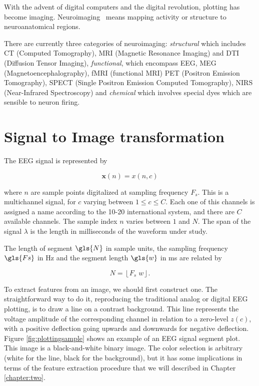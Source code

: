 
\begin{story}[Neuroimaging]
With the advent of digital computers and the digital revolution, plotting has become imaging.  Neuroimaging~\cite{Freeman2013} means mapping activity or structure to neuroanatomical regions.

There are currently three categories of neuroimaging: \textit{structural} which includes CT (Computed Tomography), MRI (Magnetic Resonance Imaging) and DTI (Diffusion Tensor Imaging), \textit{functional}, which encompass EEG, MEG (Magnetoencephalography), fMRI (functional MRI) PET (Positron Emission Tomography), SPECT (Single Positron Emission Computed Tomography), NIRS (Near-Infrared Spectroscopy) and \textit{chemical} which involves special dyes which are sensible to neuron firing.
\end{story}

\section{Signal to Image transformation}

The EEG signal is represented by

\begin{equation}
\mathbf{x}(n) = x(n,c)
\label{eq:zerolevel}
\end{equation}

\noindent where $n$ are sample points digitalized at sampling frequency $F_s$.  This is a multichannel signal, for $c$ varying between  $1 \leq c \leq C$.  Each one of this channels is assigned a name according to the 10-20 international system, and there are $C$ available channels. The sample index $n$ varies between $1$ and $N$.  The span of the signal $\lambda$ is the length in milliseconds of the waveform under study. 

The length of segment $\gls{N}$ in sample units, the sampling frequency $\gls{Fs}$ in \si{\hertz} and the segment length $\gls{w}$ in \si{\ms} are related by

\begin{equation}
N = \left\lfloor F_s \; w \right\rfloor.
\label{eq:segmentlength}
\end{equation}

\vspace{3pt}

To extract features from an image, we should first construct one.  The straightforward way to do it, reproducing the traditional analog or digital EEG plotting, is to draw a line on a contrast background.  This line represents the voltage amplitude of the corresponding channel in relation to a zero-level $z(c)$, with a positive deflection going upwards and downwards for negative deflection.  Figure \ref{fig:plottingsample} shows an example of an EEG signal segment plot.  This image is a black-and-white binary image.  The color selection is arbitrary (white for the line, black for the background), but it has some implications in terms of the feature extraction procedure that we will described in Chapter \ref{chapter:two}.

